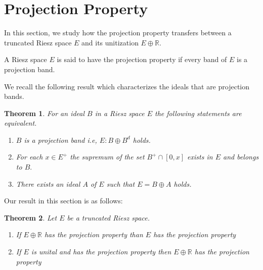 \documentclass{birkau}
\numberwithin{equation}{section}
\theoremstyle{plain}
\newtheorem{theorem}{Theorem}[section]
\theoremstyle{definition}
\begin{document}
\section{Projection Property}
In this section, we study how the projection property transfers between a
truncated Riesz space $E$ and its unitization $E\oplus \mathbb{R}$.

A Riesz space $E$ is said to have the projection property if every band of $E
$ is a projection band. 

We recall the following result which characterizes the ideals that are
projection bands.

\begin{theorem}\cite[Theorem 1.41]{positiveoperator}
	For an ideal $B$ in a Riesz space $E$ the following statements are
	equivalent.
	
	\begin{enumerate}
		\item $B$ is a projection band i.e, $E:B\oplus B^{d}$ holds.
		
		\item For each $x\in E^{+}$ the supremum of the set $B^{+}\cap \left[ 0,x%
		\right] $ exists in $E$ and belongs to $B.$
		
		\item There exists an ideal $A$ of $E$ such that $E=B\oplus A$ holds.
	\end{enumerate}
\end{theorem}

Our result in this section is as follows:

\begin{theorem}
	Let $E$ be a truncated Riesz space.
	
	\begin{enumerate}
		\item If $E\oplus 
		\mathbb{R}
		$ has the projection property than $E$ has the projection property
		
		\item If $E$ is unital and has the projection property then $E\oplus 
		\mathbb{R}
		$ has the projection property
	\end{enumerate}
\end{theorem}
\end{document}
